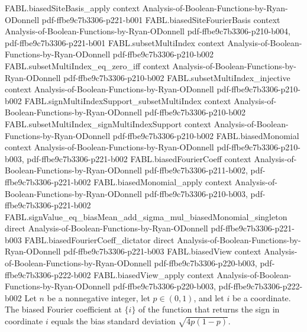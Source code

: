 \begin{theorem}
\proofstep
  {FABL.biasedSiteBasis_apply}
  {context}
  {Analysis-of-Boolean-Functions-by-Ryan-ODonnell}
  {pdf-ffbe9c7b3306-p221-b001}
\proofstep
  {FABL.biasedSiteFourierBasis}
  {context}
  {Analysis-of-Boolean-Functions-by-Ryan-ODonnell}
  {pdf-ffbe9c7b3306-p210-b004,
    pdf-ffbe9c7b3306-p221-b001}
\proofstep
  {FABL.subsetMultiIndex}
  {context}
  {Analysis-of-Boolean-Functions-by-Ryan-ODonnell}
  {pdf-ffbe9c7b3306-p210-b002}
\proofstep
  {FABL.subsetMultiIndex_eq_zero_iff}
  {context}
  {Analysis-of-Boolean-Functions-by-Ryan-ODonnell}
  {pdf-ffbe9c7b3306-p210-b002}
\proofstep
  {FABL.subsetMultiIndex_injective}
  {context}
  {Analysis-of-Boolean-Functions-by-Ryan-ODonnell}
  {pdf-ffbe9c7b3306-p210-b002}
\proofstep
  {FABL.signMultiIndexSupport_subsetMultiIndex}
  {context}
  {Analysis-of-Boolean-Functions-by-Ryan-ODonnell}
  {pdf-ffbe9c7b3306-p210-b002}
\proofstep
  {FABL.subsetMultiIndex_signMultiIndexSupport}
  {context}
  {Analysis-of-Boolean-Functions-by-Ryan-ODonnell}
  {pdf-ffbe9c7b3306-p210-b002}
\proofstep
  {FABL.biasedMonomial}
  {context}
  {Analysis-of-Boolean-Functions-by-Ryan-ODonnell}
  {pdf-ffbe9c7b3306-p210-b003,
    pdf-ffbe9c7b3306-p221-b002}
\proofstep
  {FABL.biasedFourierCoeff}
  {context}
  {Analysis-of-Boolean-Functions-by-Ryan-ODonnell}
  {pdf-ffbe9c7b3306-p211-b002,
    pdf-ffbe9c7b3306-p221-b002}
\proofstep
  {FABL.biasedMonomial_apply}
  {context}
  {Analysis-of-Boolean-Functions-by-Ryan-ODonnell}
  {pdf-ffbe9c7b3306-p210-b003,
    pdf-ffbe9c7b3306-p221-b002}
\proofstep
  {FABL.signValue_eq_biasMean_add_sigma_mul_biasedMonomial_singleton}
  {direct}
  {Analysis-of-Boolean-Functions-by-Ryan-ODonnell}
  {pdf-ffbe9c7b3306-p221-b003}
\proofstep
  {FABL.biasedFourierCoeff_dictator}
  {direct}
  {Analysis-of-Boolean-Functions-by-Ryan-ODonnell}
  {pdf-ffbe9c7b3306-p221-b003}
\proofstep
  {FABL.biasedView}
  {context}
  {Analysis-of-Boolean-Functions-by-Ryan-ODonnell}
  {pdf-ffbe9c7b3306-p220-b003,
    pdf-ffbe9c7b3306-p222-b002}
\proofstep
  {FABL.biasedView_apply}
  {context}
  {Analysis-of-Boolean-Functions-by-Ryan-ODonnell}
  {pdf-ffbe9c7b3306-p220-b003,
    pdf-ffbe9c7b3306-p222-b002}
Let $n$ be a nonnegative integer, let $p\in(0,1)$, and let $i$ be a coordinate. The
biased Fourier coefficient at $\{i\}$ of the function that returns the sign in
coordinate $i$ equals the bias standard deviation $\sqrt{4p(1-p)}$.
\end{theorem}

